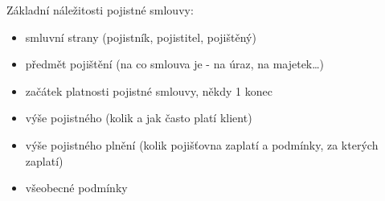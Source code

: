 Základní náležitosti pojistné smlouvy:
\begin{itemize}
    \item smluvní strany (pojistník, pojistitel, pojištěný)
    \item předmět pojištění (na co smlouva je - na úraz, na majetek\ldots)
    \item začátek platnosti pojistné smlouvy, někdy 1 konec
    \item výše pojistného (kolik a jak často platí klient)
    \item výše pojistného plnění (kolik pojišťovna zaplatí a podmínky, za kterých zaplatí)
    \item všeobecné podmínky
\end{itemize}
